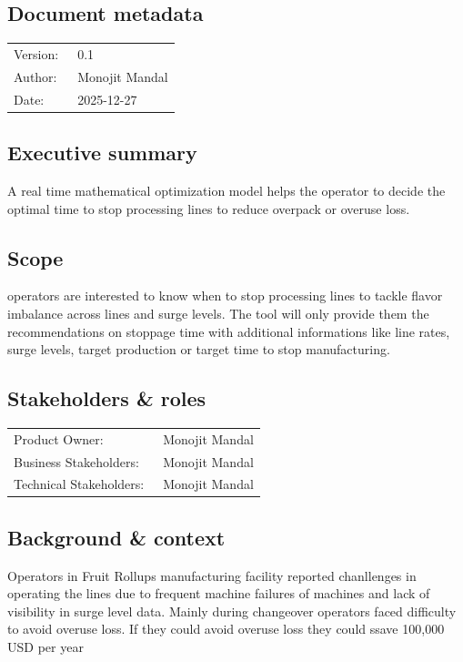\documentclass[a4paper,10pt]{article}
\begin{document}
\subsection*{Document metadata}
\begin{tabular}{ l l }
Version: &\ 0.1 \\
Author: & \ Monojit Mandal\\
Date: & \ 2025-12-27\\
\end{tabular}

\subsection*{Executive summary}
A real time mathematical optimization model helps the operator to decide
the optimal time to stop processing lines to reduce overpack or overuse loss.

\subsection*{Scope}
operators are interested to know when to stop processing lines to tackle flavor
imbalance across lines and surge levels. The tool will only provide them the 
recommendations on stoppage time with additional informations like line rates,
surge levels, target production or target time to stop manufacturing.

\subsection*{Stakeholders \& roles}
\begin{tabular}{ l l }
Product Owner: &\ Monojit Mandal \\
Business Stakeholders: & \ Monojit Mandal\\
Technical Stakeholders: & \ Monojit Mandal\\
\end{tabular}

\subsection*{Background \& context}
Operators in Fruit Rollups manufacturing facility reported chanllenges in 
operating the lines due to frequent machine failures of machines and lack of 
visibility in surge level data. Mainly during changeover operators faced 
difficulty to avoid overuse loss. If they could avoid overuse loss they could
ssave 100,000 USD per year
\end{document}
